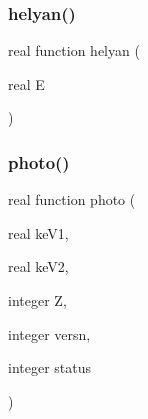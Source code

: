 \mbox{\label{photo_8f_a897128d74da5e00797220720c7ba3a42}} 
\subsubsection{\texorpdfstring{helyan()}{helyan()}}
{\footnotesize\ttfamily real function helyan (\begin{DoxyParamCaption}\item[{real}]{E }\end{DoxyParamCaption})}

\mbox{\label{photo_8f_ab440cd63271f928e41157ffa5b941e90}} 
\subsubsection{\texorpdfstring{photo()}{photo()}}
{\footnotesize\ttfamily real function photo (\begin{DoxyParamCaption}\item[{real}]{ke\+V1,  }\item[{real}]{ke\+V2,  }\item[{integer}]{Z,  }\item[{integer}]{versn,  }\item[{integer}]{status }\end{DoxyParamCaption})}

